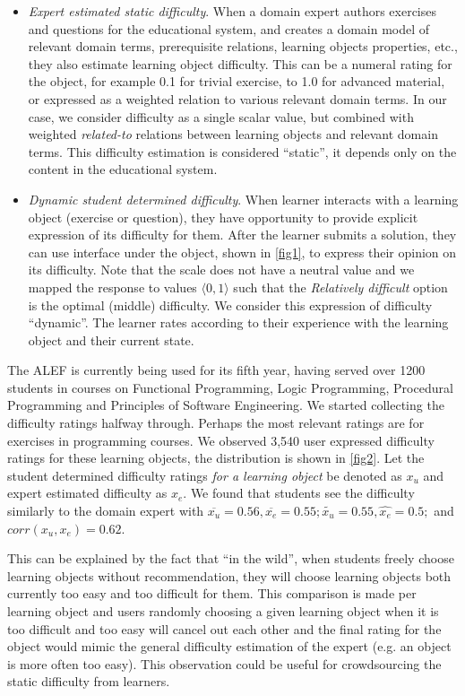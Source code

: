 \documentclass{llncs}
\begin{document}
\begin{itemize}
\item \emph{Expert estimated static difficulty}. When a domain expert authors exercises and questions for the educational system, and creates a domain model of relevant domain terms, prerequisite relations, learning objects properties, etc., they also estimate learning object difficulty. This can be a numeral rating for the object, for example 0.1 for trivial exercise, to 1.0 for advanced material, or expressed as a weighted relation to various relevant domain terms. In our case, we consider difficulty as a single scalar value, but combined with weighted \emph{related-to} relations between learning objects and relevant domain terms. This difficulty estimation is considered ``static'', it depends only on the content in the educational system.
\item \emph{Dynamic student determined difficulty}. When learner interacts with a learning object (exercise or question), they have opportunity to provide explicit expression of its difficulty for them. After the learner submits a solution, they can use interface under the object, shown in \cref{fig1}, to express their opinion on its difficulty. Note that the scale does not have a neutral value and we mapped the response to values $\langle 0,1 \rangle$ such that the \emph{Relatively difficult} option is the optimal (middle) difficulty. We consider this expression of difficulty ``dynamic''. The learner rates according to their experience with the learning object and their current state.
\end{itemize}

The ALEF is currently being used for its fifth year, having served over 1200 students in courses on Functional Programming, Logic Programming, Procedural Programming and Principles of Software Engineering. We started collecting the difficulty ratings halfway through. Perhaps the most relevant ratings are for exercises in programming courses. We observed 3,540 user expressed difficulty ratings for these learning objects, the distribution is shown in \cref{fig2}. Let the student determined difficulty ratings \emph{for a learning object} be denoted as $x_u$ and expert estimated difficulty as $x_e$. We found that students see the difficulty similarly to the domain expert with $\overline{x_u} = 0.56, \overline{x_e} = 0.55; \widetilde{x_u} = 0.55, \widehat{x_e}=0.5;$ and $corr(x_u, x_e) = 0.62$.

This can be explained by the fact that ``in the wild'', when students freely choose learning objects without recommendation, they will choose learning objects both currently too easy and too difficult for them. This comparison is made per learning object and users randomly choosing a given learning object when it is too difficult and too easy will cancel out each other and the final rating for the object would mimic the general difficulty estimation of the expert (e.g. an object is more often too easy). This observation could be useful for crowdsourcing the static difficulty from learners.
\end{document}
